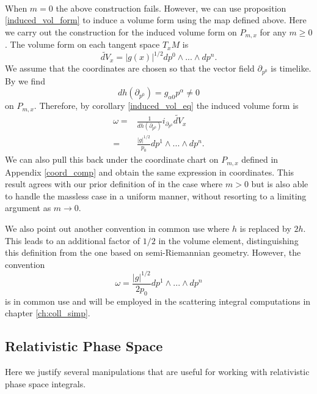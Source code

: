 \\
When $m=0$ the above construction fails.  However, we can use proposition \ref{induced_vol_form} to induce a volume form using the map  defined above. Here we carry out the construction for the induced volume form on $P_{m,x}$ for any $m\geq 0$. The volume form on each tangent space $T_xM$ is
\begin{equation}
\tilde{dV}_x=|g(x)|^{1/2}dp^0\wedge...\wedge dp^n.
\end{equation}
We assume that the coordinates are chosen so that the vector field $\partial_{p^0}$ is timelike. By  we find
\begin{equation}
dh(\partial_{p^0})=g_{\alpha 0}p^\alpha\neq 0
\end{equation}
on $P_{m,x}$.  Therefore, by corollary \ref{induced_vol_eq} the induced volume form is
\begin{align}\label{mass_shell_vol}
\omega=&\frac{1}{dh(\partial_{p^0})} i_{\partial_{p^0}} \tilde{dV}_x\\
=&\frac{|g|^{1/2}}{p_0}dp^1\wedge...\wedge dp^n.
\end{align}
We can also pull this back under the coordinate chart on $P_{m,x}$ defined in Appendix \ref{coord_comp} and obtain the same expression in coordinates. This result agrees with our prior definition of  in the case where $m>0$ but is also able to handle the massless case in a uniform manner, without resorting to a limiting argument as $m\rightarrow 0$.

We also point out another convention in common use where $h$ is replaced by $2h$.  This leads to an additional factor of $1/2$ in the volume element, distinguishing this definition from the one based on semi-Riemannian geometry.  However, the convention
\begin{equation}
\omega=\frac{|g|^{1/2}}{2p_0}dp^1\wedge...\wedge dp^n
\end{equation}
 is in common use and will be employed in the scattering integral computations in chapter \ref{ch:coll_simp}.

\subsection{Relativistic Phase Space}
Here we justify several manipulations that are useful for working with relativistic phase space integrals.


